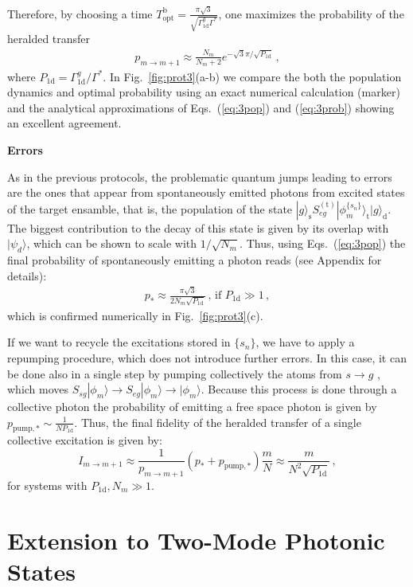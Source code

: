 \documentclass[twocolumn,pra,aps,superscriptaddress,showpacs]{revtex4-1}
\newcommand{\ket}[1]{|#1\rangle}
\def\oned{\mathrm{1d}}
\newcommand{\trg}{\mathrm{(t)}}
\newcommand{\rs}{\mathrm{s}}
\newcommand{\rd}{\mathrm{d}}
\newcommand{\rt}{\mathrm{t}}
\newcommand{\bb}{\mathrm{b}}
\begin{document}
Therefore, by choosing a time $T_\mathrm{opt}^\bb=\frac{\pi\sqrt{3}}{\sqrt{\Gamma_{\oned}^g \Gamma^*}}$, one maximizes the probability of the heralded transfer
%
\begin{align} \label{eq:3prob}
	p_{m\rightarrow m+1}
		\approx \frac{N_m}{N_m+2} e^{-\sqrt{3}\pi/\sqrt{P_\oned}}\,,
\end{align}
%
where $P_\oned=\Gamma_\oned^g/\Gamma^*$. In Fig.~\ref{fig:prot3}(a-b) we compare the both the population dynamics and optimal probability using an exact numerical calculation (marker) and the analytical approximations of Eqs.~(\ref{eq:3pop}) and (\ref{eq:3prob}) showing an excellent agreement.

\textbf{Errors}

As in the previous protocols, the problematic quantum jumps leading to errors are the ones that appear from spontaneously emitted photons from excited states of the target ensamble, that is, the population of the state $\ket{g}_\rs S_{eg}^\trg \ket{\phi_m^{ \{ s_n \}}}_\rt \ket{g}_\rd$. The biggest contribution to the decay of this state is given by its overlap with $\ket{\psi_d}$, which can be shown to scale with $1/\sqrt{N_m}$. Thus, using Eqs.~(\ref{eq:3pop}) the final probability of spontaneously emitting a photon reads (see Appendix for details):
%
\begin{align}\label{eq:3sp_em}
p_{*}
	\approx \frac{\pi\sqrt{3}}{2N_m\sqrt{P_\oned}}\,,\,\mathrm{if}\,\, P_\oned\gg 1\,,
\end{align}
%
which is confirmed numerically in Fig.~\ref{fig:prot3}(c).
 
If we want to recycle the excitations stored in $\{s_n\}$, we have to apply a repumping procedure, which does not introduce further errors. In this case, it can be done also in a single step by pumping collectively the atoms from $s\rightarrow g$ , which moves $S_{sg}\ket{\phi_m}\rightarrow S_{eg}\ket{\phi_m}\rightarrow\ket{\phi_m}$.  Because this process is done through a collective photon the probability of emitting a free space photon is given by $p_{\mathrm{pump},*} \sim \frac{1}{NP_\oned}$. Thus, the final fidelity of the heralded transfer of a single collective excitation is given by: 
%
\begin{equation} \label{eq:3infid}
I_{m\rightarrow m+1}
	\approx \frac{1}{p_{m \rightarrow m+1}} (p_{*}+p_{\mathrm{pump},*}) \frac{m}{N}
	\approx \frac{m}{N^2 \sqrt{P_\oned}}\,,
\end{equation}
%
for systems with $P_\oned,N_m\gg 1$. 

\section{Extension to Two-Mode Photonic States \label{sec:twomode}}
\end{document}
